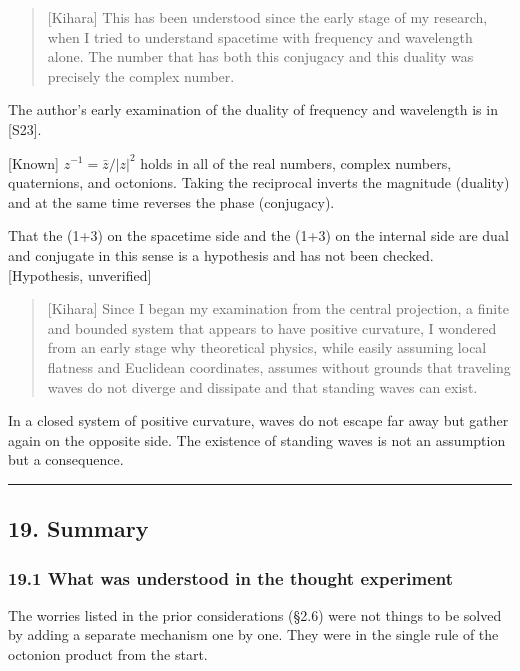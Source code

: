 \documentclass[
  a4paper,
]{article}
\begin{document}
\begin{quote}
{[}Kihara{]} This has been understood since the early stage of my
research, when I tried to understand spacetime with frequency and
wavelength alone. The number that has both this conjugacy and this
duality was precisely the complex number.
\end{quote}

The author's early examination of the duality of frequency and
wavelength is in {[}S23{]}.

{[}Known{]} \(z^{-1} = \bar z/\lvert z\rvert^2\) holds in all of the
real numbers, complex numbers, quaternions, and octonions. Taking the
reciprocal inverts the magnitude (duality) and at the same time reverses
the phase (conjugacy).

That the (1+3) on the spacetime side and the (1+3) on the internal side
are dual and conjugate in this sense is a hypothesis and has not been
checked. {[}Hypothesis, unverified{]}

\begin{quote}
{[}Kihara{]} Since I began my examination from the central projection, a
finite and bounded system that appears to have positive curvature, I
wondered from an early stage why theoretical physics, while easily
assuming local flatness and Euclidean coordinates, assumes without
grounds that traveling waves do not diverge and dissipate and that
standing waves can exist.
\end{quote}

In a closed system of positive curvature, waves do not escape far away
but gather again on the opposite side. The existence of standing waves
is not an assumption but a consequence.

\begin{center}\rule{0.5\linewidth}{0.5pt}\end{center}

\subsection{19. Summary}\label{summary}

\subsubsection{19.1 What was understood in the thought
experiment}\label{what-was-understood-in-the-thought-experiment}

The worries listed in the prior considerations (§2.6) were not things to
be solved by adding a separate mechanism one by one. They were in the
single rule of the octonion product from the start.
\end{document}

